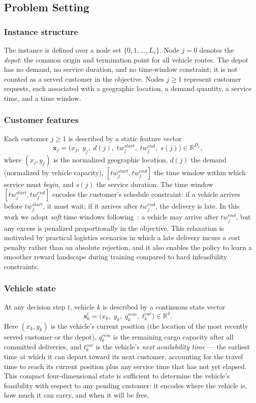 \documentclass[conference]{IEEEtran}
\begin{document}
\subsection{Problem Setting}
\label{sec:prob_setting}

\subsubsection{Instance structure}
The instance is defined over a node set $\{0, 1, \ldots, L_c\}$.
Node $j = 0$ denotes the \emph{depot}: the common origin and termination point for all vehicle routes.
The depot has no demand, no service duration, and no time-window constraint; it is not counted as a served customer in the objective.
Nodes $j \geq 1$ represent customer requests, each associated with a geographic location, a demand quantity, a service time, and a time window.

\subsubsection{Customer features}
Each customer $j \geq 1$ is described by a static feature vector
\[
\mathbf{x}_j = \bigl(x_j,\; y_j,\; d(j),\; tw^{start}_j,\; tw^{end}_j,\; s(j)\bigr) \in \mathbb{R}^{D_c},
\]
where $(x_j, y_j)$ is the normalized geographic location, $d(j)$ the demand (normalized by vehicle capacity), $[tw^{start}_j, tw^{end}_j]$ the time window within which service must \emph{begin}, and $s(j)$ the service duration.
The time window $[tw^{start}_j, tw^{end}_j]$ encodes the customer's schedule constraint: if a vehicle arrives before $tw^{start}_j$, it must wait; if it arrives after $tw^{end}_j$, the delivery is late.
In this work we adopt \emph{soft} time windows following~\cite{TAM2026114234}: a vehicle may arrive after $tw^{end}_j$, but any excess is penalized proportionally in the objective.
This relaxation is motivated by practical logistics scenarios in which a late delivery incurs a cost penalty rather than an absolute rejection, and it also enables the policy to learn a smoother reward landscape during training compared to hard infeasibility constraints.

\subsubsection{Vehicle state}
At any decision step $t$, vehicle $k$ is described by a continuous state vector
\[
\mathbf{s}_k^t = \bigl(x_k,\; y_k,\; q^{rem}_k,\; t^{cur}_k\bigr) \in \mathbb{R}^4.
\]
Here $(x_k, y_k)$ is the vehicle's current position (the location of the most recently served customer or the depot), $q^{rem}_k$ is the remaining cargo capacity after all committed deliveries, and $t^{cur}_k$ is the vehicle's \emph{next availability time} --- the earliest time at which it can depart toward its next customer, accounting for the travel time to reach its current position plus any service time that has not yet elapsed.
This compact four-dimensional state is sufficient to determine the vehicle's feasibility with respect to any pending customer: it encodes where the vehicle is, how much it can carry, and when it will be free.
\end{document}
